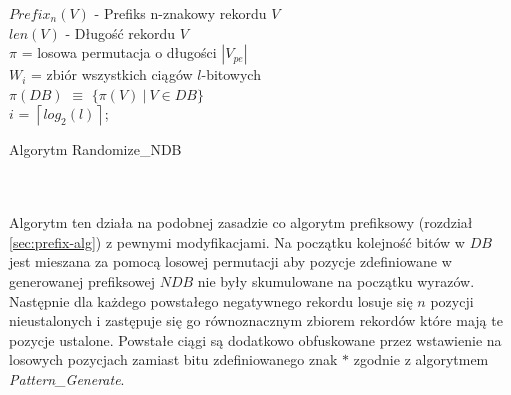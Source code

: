 \begin{algorithm}[H]
    \SetAlgoLined
    
    $Prefix_n(V)$ - Prefiks n-znakowy rekordu $V$\\
    $len(V)$ - Długość rekordu $V$\\
    $\pi$ = losowa permutacja o długości $|V_{pe}|$\\
    $W_i$ = zbiór wszystkich ciągów $l$-bitowych\\
    $\pi(DB)$ $\equiv$ $\{\pi(V) ~|~ V \in DB\}$\\
    $i$ = $\left \lceil{log_2(l)}\right \rceil$;\\
    \caption{Algorytm Randomize\_NDB}
    \label{alg:randomize}
\end{algorithm}
~\\\\
Algorytm ten działa na podobnej zasadzie co algorytm prefiksowy (rozdział \ref{sec:prefix-alg}) z pewnymi modyfikacjami.
Na początku kolejność bitów w $DB$ jest mieszana za pomocą losowej permutacji aby pozycje zdefiniowane w generowanej prefiksowej $NDB$ nie były skumulowane na początku wyrazów. Następnie dla każdego powstałego negatywnego rekordu losuje się $n$ pozycji nieustalonych i zastępuje się go równoznacznym zbiorem rekordów które mają te pozycje ustalone. 
Powstałe ciągi są dodatkowo obfuskowane przez wstawienie na losowych pozycjach zamiast bitu zdefiniowanego znak $*$ zgodnie z algorytmem \textit{Pattern\_Generate}.

